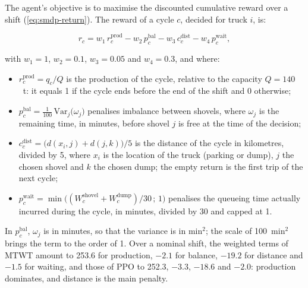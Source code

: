 \documentclass[11pt,a4paper]{article}
\newif\ifrevmarks
\newcommand{\revtag}[1]{\ifrevmarks\textsuperscript{\textcolor{red!70!black}{\scriptsize[#1]}}\fi}
\newenvironment{revbloc}[1]{\par\ifrevmarks\color{revcolor}\noindent\revtag{#1}\ \fi}{\par}
\newif\ifcorrmarks
\newcommand{\corr}[1]{\ifcorrmarks\textcolor{corrcolor}{#1}\else#1\fi}
\begin{document}
\begin{revbloc}{M10, M16, v3}
The agent's objective is to maximise the discounted cumulative reward over a shift (\cref{eq:smdp-return}). The reward of a cycle $c$, decided for truck $i$, is:

\begin{equation}
r_c = w_1\, r^{\mathrm{prod}}_c - w_2\, p^{\mathrm{bal}}_c - w_3\, c^{\mathrm{dist}}_c - w_4\, p^{\mathrm{wait}}_c ,
\label{eq:reward}
\end{equation}

with $w_1 = 1$, $w_2 = 0.1$, $w_3 = 0.05$ and $w_4 = 0.3$, and where:

\begin{itemize}
  \item $r^{\mathrm{prod}}_c = q_c / Q$ is the production of the cycle, relative to the capacity $Q = 140$~t: it equals 1 if the cycle ends before the end of the shift and 0 otherwise;
  \item $p^{\mathrm{bal}}_c = \frac{1}{100}\,\mathrm{Var}_j\big(\omega_j\big)$ penalises imbalance between shovels, where $\omega_j$ is the remaining time, in minutes, before shovel $j$ is free at the time of the decision;
  \item $c^{\mathrm{dist}}_c = \big(d(x_i, j) + d(j, k)\big)/5$ is the distance of the cycle in kilometres, divided by 5, where $x_i$ is the location of the truck (parking or dump), $j$ the chosen shovel and $k$ the chosen dump; the empty return is the first trip of the next cycle;
  \item $p^{\mathrm{wait}}_c = \min\big((W^{\mathrm{shovel}}_c + W^{\mathrm{dump}}_c)/30\,;\,1\big)$ penalises the queueing time actually incurred during the cycle, in minutes, divided by 30 and capped at 1.
\end{itemize}

\corr{In $p^{\mathrm{bal}}_c$, $\omega_j$ is in minutes, so that the variance is in min$^2$; the scale of 100~min$^2$ brings the term to the order of 1. Over a nominal shift, the weighted terms of MTWT amount to 253.6 for production, $-2.1$ for balance, $-19.2$ for distance and $-1.5$ for waiting, and those of PPO to 252.3, $-3.3$, $-18.6$ and $-2.0$: production dominates, and distance is the main penalty.}


\end{revbloc}
\end{document}
